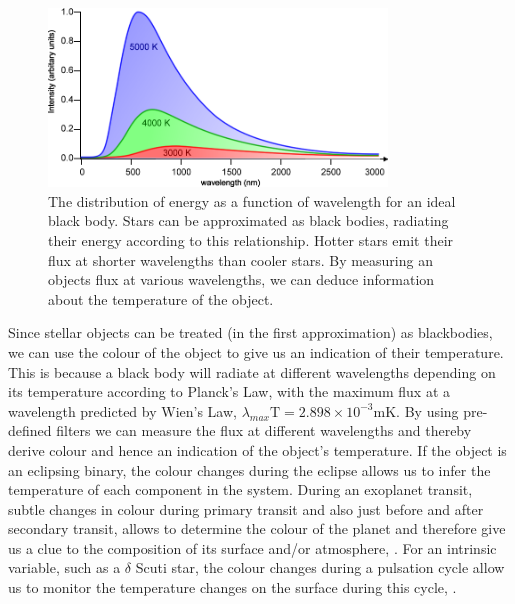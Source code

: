\begin{figure}
\centering
\includegraphics[width=90mm]{images/wienslaw.png}
\caption[Caption for LOF]{The distribution of energy as a function of wavelength for an ideal black body\protect\footnotemark. Stars can be approximated as black bodies, radiating their energy according to this relationship. Hotter stars emit their flux at shorter wavelengths than cooler stars. By measuring an objects flux at various wavelengths, we can deduce information about the temperature of the object.}
\label{fig:wienslaw}
\end{figure}


Since stellar objects can be treated (in the first approximation) as blackbodies, we can use the colour of the object to give us an indication of their temperature. This is because a black body will radiate at different wavelengths depending on its temperature according to Planck's Law, with the maximum flux at a wavelength predicted by Wien's Law, $\lambda_{max}\mbox{T} = 2.898\times10^{-3}\mbox{mK}$. By using pre-defined filters we can measure the flux at different wavelengths and thereby derive colour and hence an indication of the object's temperature. If the object is an eclipsing binary, the colour changes during the eclipse allows us to infer the temperature of each component in the system. During an exoplanet transit, subtle changes in colour during primary transit and also just before and after secondary transit, allows to determine the colour of the planet and therefore give us a clue to the composition of its surface and/or atmosphere, \citep{2012ApJS..201...36B}. For an intrinsic variable, such as a $\delta$ Scuti star, the colour changes during a pulsation cycle allow us to monitor the temperature changes on the surface during this cycle, \citep{KurtzBook}.


